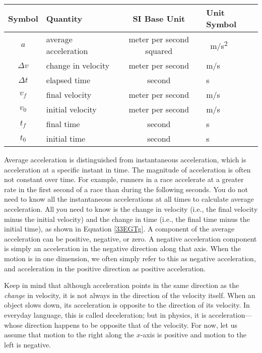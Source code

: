 \documentclass[main.tex]{subfiles}
\begin{document}
\begin{center}
    \begin{tabular}{cl|cl}
    \hline
    \textbf{Symbol} & \textbf{Quantity} & \textbf{SI Base Unit} & \textbf{Unit Symbol}  \\
    \hline\hline
    \rule{0pt}{2.5ex}
        $a$ & average acceleration & meter per second squared & \SI{}{\meter/\second^2}\\
        $\Delta{v}$ & change in velocity & meter per second & m/s\\
        $\Delta{t}$ & elapsed time & second & s \\
    \hline
        $v_f$ & final velocity & meter per second & m/s\\
        $v_0$ & initial velocity & meter per second & m/s\\
        $t_f$ & final time & second & s \\    
        $t_0$ & initial time & second & s \\
        \hline
    \end{tabular}
    \captionsetup{type=figure,margin=1in,font=scriptsize}
\end{center}

Average acceleration is distinguished from \gls{instantaneous acceleration}, which is acceleration at a specific instant in time. The magnitude of acceleration is often not constant over time. For example, runners in a race accelerate at a greater rate in the first second of a race than during the following seconds. You do not need to know all the instantaneous accelerations at all times to calculate average acceleration. All you need to know is the change in velocity (i.e., the final velocity minus the initial velocity) and the change in time (i.e., the final time minus the initial time), as shown in Equation \eqref{33EGTg}. A component of the average acceleration can be positive, negative, or zero. A \gls{negative acceleration} component is simply an acceleration in the negative direction along that axis. When the motion is in one dimension, we often simply refer to this as negative acceleration, and acceleration in the positive direction as positive acceleration.

\vspace{1em}

Keep in mind that although acceleration points in the same direction as the \textit{change} in velocity, it is not always in the direction of the velocity itself. When an object slows down, its acceleration is opposite to the direction of its velocity. In everyday language, this is called deceleration; but in physics, it is acceleration---whose direction happens to be opposite that of the velocity. For now, let us assume that motion to the right along the $x$-axis is positive and motion to the left is negative.
\end{document}
